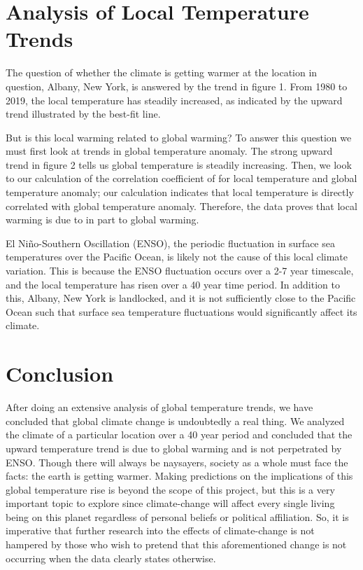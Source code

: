 \documentclass[12pt]{article}
\begin{document}
\section*{Analysis of Local Temperature Trends}
The question of whether the climate is getting warmer at the
location in question, Albany, New York, is answered by
the trend in figure 1.
From 1980 to 2019, the local temperature has steadily increased,
as indicated by the upward trend illustrated by the best-fit line.

But is this local warming related to global warming?
To answer this question we must first look at trends in
global temperature anomaly.
The strong upward trend in figure 2 tells us global temperature is
steadily increasing.
Then, we look to our calculation of the correlation coefficient of
for local temperature and global temperature anomaly;
our calculation indicates that local temperature is directly
correlated with global temperature anomaly.
Therefore, the data proves that local warming is due to in part
to global warming.

El Ni\~{n}o-Southern Oscillation (ENSO), the periodic fluctuation in
surface sea temperatures over the Pacific Ocean, is likely not
the cause of this local climate variation.
This is because the ENSO fluctuation occurs over a 2-7 year timescale,
and the local temperature has risen over a 40 year time period.
In addition to this, Albany, New York is landlocked, and it is not
sufficiently close to the Pacific Ocean such that surface sea
temperature fluctuations would significantly affect its climate.

\section*{Conclusion}
After doing an extensive analysis of global temperature trends,
we have concluded that global climate change is undoubtedly a
real thing.
We analyzed the climate of a particular location over a
40 year period and concluded that the upward temperature trend
is due to global warming and is not perpetrated by ENSO.
Though there will always be naysayers, society as a whole must
face the facts: the earth is getting warmer.
Making predictions on the implications of this global
temperature rise is beyond the scope of this project, but this is
a very important topic to explore since climate-change will affect
every single living being on this planet regardless of
personal beliefs or political affiliation.
So, it is imperative that further research into the effects of
climate-change is not hampered by those who wish to pretend that
this aforementioned change is not occurring when the data
clearly states otherwise.
\end{document}
